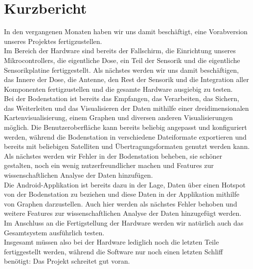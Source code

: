 \section{Kurzbericht}
In den vergangenen Monaten haben wir uns damit beschäftigt, eine Vorabversion unseres Projektes fertigzustellen.\\ 
Im Bereich der Hardware sind bereits der Fallschirm, die Einrichtung unseres Mikrocontrollers, die eigentliche Dose, ein Teil der Sensorik und die eigentliche Sensorikplatine fertiggestellt. Als nächstes werden wir uns damit beschäftigen, das Innere der Dose, die Antenne, den Rest der Sensorik und die Integration aller Komponenten fertigzustellen und die gesamte Hardware ausgiebig zu testen. \\
Bei der Bodenstation ist bereits das Empfangen, das Verarbeiten, das Sichern, das Weiterleiten und das Visualisieren der Daten mithilfe einer dreidimensionalen Kartenvisualisierung, einem Graphen und diversen anderen Visualisierungen möglich. Die Benutzeroberfläche kann bereits beliebig angepasst und konfiguriert werden, während die Bodenstation in verschiedene Dateiformate exportieren und bereits mit beliebigen Satelliten und Übertragungsformaten genutzt werden kann. Als nächstes werden wir Fehler in der Bodenstation beheben, sie schöner gestalten, noch ein wenig nutzerfreundlicher machen und Features zur wissenschaftlichen Analyse der Daten hinzufügen. \\
Die Android-Applikation ist bereits dazu in der Lage, Daten über einen Hotspot von der Bodenstation zu beziehen und diese Daten in der Applikation mithilfe von Graphen darzustellen. Auch hier werden als nächstes Fehler behoben und weitere Features zur wissenschaftlichen Analyse der Daten hinzugefügt werden. \\
Im Anschluss an die Fertigstellung der Hardware werden wir natürlich auch das Gesamtsystem ausführlich testen. \\
Insgesamt müssen also bei der Hardware lediglich noch die letzten Teile fertiggestellt werden, während die Software nur noch einen letzten Schliff benötigt: Das Projekt schreitet gut voran.